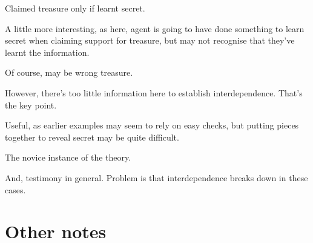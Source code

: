 \begin{note}
  \begin{illustration}
    Claimed treasure only if learnt secret.
  \end{illustration}
  A little more interesting, as here, agent is going to have done something to learn secret when claiming support for treasure, but may not recognise that they've learnt the information.

  Of course, may be wrong treasure.

  However, there's too little information here to establish interdependence.
  That's the key point.

  Useful, as earlier examples may seem to rely on easy checks, but putting pieces together to reveal secret may be quite difficult.
\end{note}

\begin{note}
  The novice instance of the theory.

  And, testimony in general.
  Problem is that interdependence breaks down in these cases.
\end{note}


\newpage

\section{Other notes}
\label{sec:other-notes}





